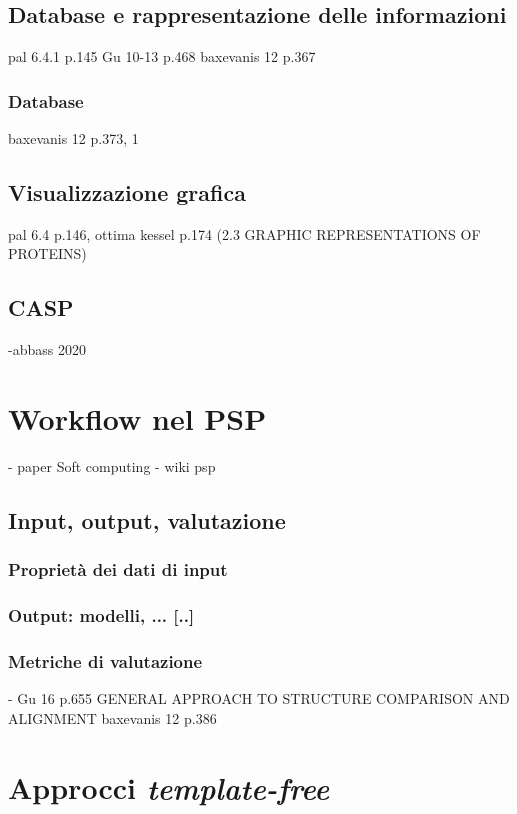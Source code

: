 \subsection{Database e rappresentazione delle informazioni}
pal 6.4.1 p.145
Gu 10-13 p.468
baxevanis 12 p.367

\subsubsection{Database}
baxevanis 12 p.373, 1

\subsection{Visualizzazione grafica}
pal 6.4 p.146, ottima
kessel p.174 (2.3 GRAPHIC REPRESENTATIONS OF PROTEINS)

\subsection{CASP}
-abbass 2020

\section{Workflow nel PSP}
- paper Soft computing
- wiki psp

\subsection{Input, output, valutazione}
\subsubsection{Proprietà dei dati di input}

\subsubsection{Output: modelli, ... [..]}
\subsubsection{Metriche di valutazione}
- Gu 16 p.655 GENERAL APPROACH TO STRUCTURE COMPARISON AND ALIGNMENT
baxevanis 12 p.386

\section{Approcci \textit{template-free}} \label{sec:template-free}

